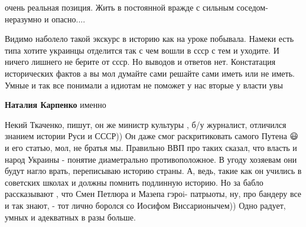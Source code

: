 \begin{itemize}
очень реальная позиция. Жить в постоянной вражде с сильным соседом-неразумно и
опасно....

 

Видимо наболело такой экскурс в историю как на уроке побывала. Намеки есть типа
хотите украинцы отделится так с чем вошли в ссср с тем и уходите. И ничего
лишнего не берите от ссср. Но выводов и ответов нет. Констатация исторических
фактов а вы мол думайте сами решайте сами иметь или не иметь. Умные и так все
понимали а идиотам не поможет у нас вторые у власти увы

\begin{itemize}
 
\textbf{Наталия Карпенко} именно
\end{itemize}

 

Некий Ткаченко, пишут, он же министр культуры , б/у журналист, отличился
знанием истории Руси и СССР)) Он даже смог раскритиковать самого Путена 😃и его
статью, мол, не братья мы. Правильно ВВП про таких сказал, что власть и народ
Украины - понятие диаметрально противоположное. В угоду хозяевам они будут
нагло врать, переписываю историю страны. А, ведь, такие как он учились в
советских школах и должны помнить подлинную историю. Но за бабло рассказывают ,
что Смен Петлюра и Мазепа гэроi- патрыоты, ну, про бандеру все и так знают, -
тот лично боролся со Иосифом Виссарионычем)) Одно радует, умных и адекватных в
разы больше.

\begin{itemize}
 

\end{itemize}
\end{itemize}
